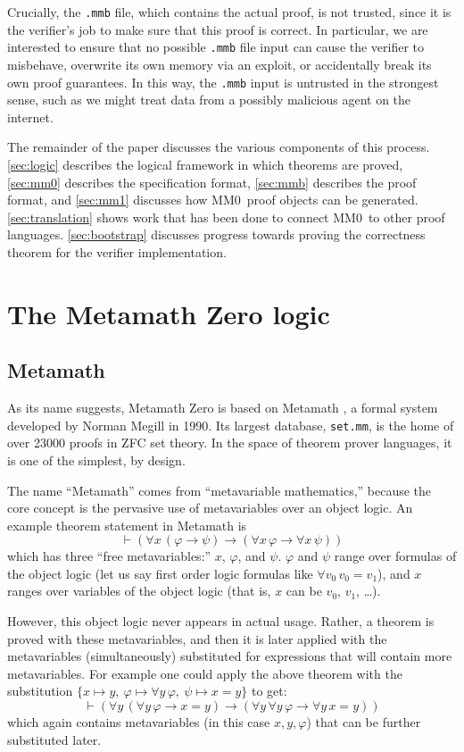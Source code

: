 \documentclass[runningheads]{llncs}
\newcommand{\mmO}{\textsf{MM0}}
\begin{document}
Crucially, the \texttt{.mmb} file, which contains the actual proof, is not trusted, since it is the verifier's job to make sure that this proof is correct. In particular, we are interested to ensure that no possible \texttt{.mmb} file input can cause the verifier to misbehave, overwrite its own memory via an exploit, or accidentally break its own proof guarantees. In this way, the \texttt{.mmb} input is untrusted in the strongest sense, such as we might treat data from a possibly malicious agent on the internet.

The remainder of the paper discusses the various components of this process. \autoref{sec:logic} describes the logical framework in which theorems are proved, \autoref{sec:mm0} describes the specification format, \autoref{sec:mmb} describes the proof format, and \autoref{sec:mm1} discusses how \mmO\ proof objects can be generated. \autoref{sec:translation} shows work that has been done to connect \mmO\ to other proof languages. \autoref{sec:bootstrap} discusses progress towards proving the correctness theorem for the verifier implementation.

\section{The Metamath Zero logic}\label{sec:logic}
\subsection{Metamath}
As its name suggests, Metamath Zero is based on Metamath \cite{Meg19}, a formal system developed by Norman Megill in 1990. Its largest database, \texttt{set.mm}, is the home of over 23000 proofs in ZFC set theory. In the space of theorem prover languages, it is one of the simplest, by design.

The name ``Metamath'' comes from ``metavariable mathematics,'' because the core concept is the pervasive use of metavariables over an object logic. An example theorem statement in Metamath is
$$\vdash (\forall x\,(\varphi\to \psi)\to(\forall x\,\varphi\to \forall x\,\psi))$$
which has three ``free metavariables:'' $x$, $\varphi$, and $\psi$. $\varphi$ and $\psi$ range over formulas of the object logic (let us say first order logic formulas like $\forall v_0\,v_0=v_1$), and $x$ ranges over variables of the object logic (that is, $x$ can be $v_0$, $v_1$, \dots).

However, this object logic never appears in actual usage. Rather, a theorem is proved with these metavariables, and then it is later applied with the metavariables (simultaneously) substituted for expressions that will contain more metavariables. For example one could apply the above theorem with the substitution $\{x\mapsto y,\ \varphi\mapsto\forall y\,\varphi,\ \psi\mapsto x=y\}$ to get:
$$\vdash (\forall y\,(\forall y\,\varphi\to x=y)\to(\forall y\,\forall y\,\varphi\to \forall y\,x=y))$$
which again contains metavariables (in this case $x,y,\varphi$) that can be further substituted later.
\end{document}
